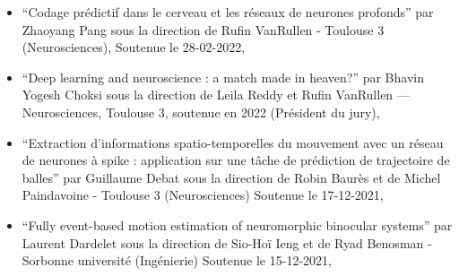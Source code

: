 \documentclass[10pt,french,a4paper]{article}%
\begin{document}
\begin{itemize}
	\item ``Codage prédictif dans le cerveau et les réseaux de neurones profonds'' 	par Zhaoyang Pang sous la direction de Rufin VanRullen - Toulouse 3 (Neurosciences), Soutenue le 28-02-2022,

    \item ``Deep learning and neuroscience : a match made in heaven?'' par Bhavin Yogesh Choksi sous la direction de Leila Reddy et Rufin VanRullen --- Neurosciences, Toulouse 3, soutenue en 2022 (Président du jury),

	\item ``Extraction d'informations spatio-temporelles du mouvement avec un réseau de neurones à spike : application sur une tâche de prédiction de trajectoire de balles'' par Guillaume Debat sous la direction de Robin Baurès et de Michel Paindavoine - Toulouse 3  (Neurosciences) 	Soutenue le 17-12-2021,

	\item ``Fully event-based motion estimation of neuromorphic binocular systems'' par Laurent Dardelet sous la direction de Sio-Hoï Ieng et de Ryad Benosman - Sorbonne université (Ingénierie) Soutenue le 15-12-2021,







\end{itemize}
\end{document}
